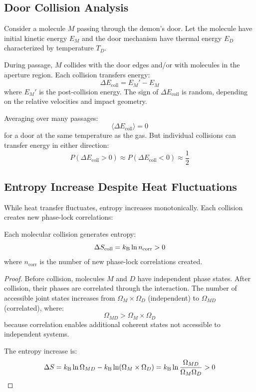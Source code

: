 \subsection{Door Collision Analysis}

Consider a molecule $M$ passing through the demon's door. Let the molecule have initial kinetic energy $E_M$ and the door mechanism have thermal energy $E_D$ characterized by temperature $T_D$.

During passage, $M$ collides with the door edges and/or with molecules in the aperture region. Each collision transfers energy:
\begin{equation}
\Delta E_{\text{coll}} = E_M' - E_M
\end{equation}
where $E_M'$ is the post-collision energy. The sign of $\Delta E_{\text{coll}}$ is random, depending on the relative velocities and impact geometry.

Averaging over many passages:
\begin{equation}
\langle \Delta E_{\text{coll}} \rangle = 0
\end{equation}
for a door at the same temperature as the gas. But individual collisions can transfer energy in either direction:
\begin{equation}
P(\Delta E_{\text{coll}} > 0) \approx P(\Delta E_{\text{coll}} < 0) \approx \frac{1}{2}
\end{equation}

\subsection{Entropy Increase Despite Heat Fluctuations}

While heat transfer fluctuates, entropy increases monotonically. Each collision creates new phase-lock correlations:

\begin{proposition}
\label{prop:collision_entropy}
Each molecular collision generates entropy:
\begin{equation}
\Delta S_{\text{coll}} = k_{\mathrm{B}} \ln n_{\text{corr}} > 0
\end{equation}
where $n_{\text{corr}}$ is the number of new phase-lock correlations created.
\end{proposition}

\begin{proof}
Before collision, molecules $M$ and $D$ have independent phase states. After collision, their phases are correlated through the interaction. The number of accessible joint states increases from $\Omega_M \times \Omega_D$ (independent) to $\Omega_{MD}$ (correlated), where:
\begin{equation}
\Omega_{MD} > \Omega_M \times \Omega_D
\end{equation}
because correlation enables additional coherent states not accessible to independent systems.

The entropy increase is:
\begin{equation}
\Delta S = k_{\mathrm{B}} \ln \Omega_{MD} - k_{\mathrm{B}} \ln(\Omega_M \times \Omega_D) = k_{\mathrm{B}} \ln \frac{\Omega_{MD}}{\Omega_M \Omega_D} > 0
\end{equation}
\end{proof}

